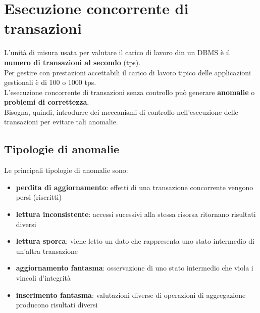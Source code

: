
\chapter{Esecuzione concorrente di transazioni}
L'unità di misura usata per valutare il carico di lavoro din un DBMS è il \textcolor{azzurrino}{\textbf{numero di transazioni al secondo}} (tps).\\[0.2ex]
Per gestire con prestazioni accettabili il carico di lavoro tipico delle applicazioni gestionali è di 100 o 1000 tps.\\[0.2ex]
L'esecuzione concorrente di transazioni senza controllo può generare \textbf{anomalie} o \textbf{problemi di correttezza}.\\[0.2ex]
Bisogna, quindi, introdurre dei meccanismi di controllo nell'esecuzione delle transazioni per evitare tali anomalie.

\section{Tipologie di anomalie}
Le principali tipologie di anomalie sono:
\begin{itemize}[label=$\triangleright$, itemsep=\smallskipamount]
    \item \textbf{perdita di aggiornamento}: effetti di una transazione concorrente vengono persi (riscritti)
    \item \textbf{lettura inconsistente}: accessi sucessivi alla stessa risorsa ritornano risultati diversi
    \item \textbf{lettura sporca}: viene letto un dato che rappresenta uno stato intermedio di un'altra transazione
    \item \textbf{aggiornamento fantasma}: osservazione di uno stato intermedio che viola i vincoli d'integrità
    \item \textbf{inserimento fantasma}: valutazioni diverse di operazioni di aggregazione producono risultati diversi
\end{itemize}


